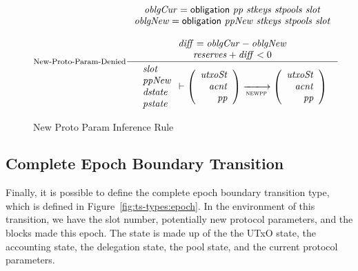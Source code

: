 \begin{figure}[htb]
  \nextdef

  \begin{equation}\label{eq:new-pc-denied}
    \inference[New-Proto-Param-Denied]
    {
      \var{oblgCur} = \obligation{pp}{stkeys}{stpools}{slot} \\
      \var{oblgNew} = \obligation{ppNew}{stkeys}{stpools}{slot} \\
      ~\\
      \var{diff} = \var{oblgCur} - \var{oblgNew} \\
      \var{reserves} + \var{diff} < 0\\
    }
    {
      \begin{array}{l}
        \var{slot}\\
        \var{ppNew}\\
        \var{dstate}\\
        \var{pstate}\\
      \end{array}
      \vdash
      \left(
        \begin{array}{r}
          \var{utxoSt} \\
          \var{acnt} \\
          \var{pp}
        \end{array}
      \right)
      \trans{newpp}{}
      \left(
        \begin{array}{rcl}
          \var{utxoSt} \\
          \var{acnt} \\
          \var{pp}
        \end{array}
      \right)
    }
  \end{equation}
  \caption{New Proto Param Inference Rule}
  \label{fig:rules:new-proto-param}
\end{figure}

\clearpage

\subsection{Complete Epoch Boundary Transition}
\label{sec:total-epoch}

Finally, it is possible to define the complete epoch boundary transition type,
which is defined in Figure~\ref{fig:ts-types:epoch}.
In the environment of this transition, we have the slot number, potentially new
protocol parameters, and the blocks made this epoch.  The state is made up of the
the UTxO state, the accounting state, the delegation state, the pool state, and
the current protocol parameters.


